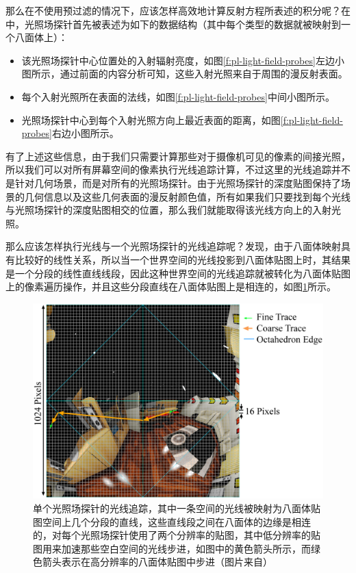 那么在不使用预过滤的情况下，应该怎样高效地计算反射方程所表述的积分呢？在\cite{a:Real-TimeGlobalIlluminationusingPrecomputedLightFieldProbes}中，光照场探针首先被表述为如下的数据结构\cite{a:ALightFieldRepresentationforRealTimeGlobalIllumination}（其中每个类型的数据就被映射到一个八面体上）：

\begin{itemize}
	\item 该光照场探针中心位置处的入射辐射亮度，如图\ref{f:pl-light-field-probes}左边小图所示，通过前面的内容分析可知，这些入射光照来自于周围的漫反射表面。
	\item 每个入射光照所在表面的法线，如图\ref{f:pl-light-field-probes}中间小图所示。
	\item 光照场探针中心到每个入射光照方向上最近表面的距离，如图\ref{f:pl-light-field-probes}右边小图所示。
\end{itemize}

有了上述这些信息，由于我们只需要计算那些对于摄像机可见的像素的间接光照，所以我们可以对所有屏幕空间的像素执行光线追踪计算，不过这里的光线追踪并不是针对几何场景，而是对所有的光照场探针。由于光照场探针的深度贴图保持了场景的几何信息以及这些几何表面的漫反射颜色值，所有如果我们只要找到每个光线与光照场探针的深度贴图相交的位置，那么我们就能取得该光线方向上的入射光照。

那么应该怎样执行光线与一个光照场探针的光线追踪呢？\cite{a:ALightFieldRepresentationforRealTimeGlobalIllumination}发现，由于八面体映射具有比较好的线性关系，所以当一个世界空间的光线投影到八面体贴图上时，其结果是一个分段的线性直线线段，因此这种世界空间的光线追踪就被转化为八面体贴图上的像素遍历操作，并且这些分段直线在八面体贴图上是相连的，如图\ref{f:pl-single-probe-ray-tracing}所示。

\begin{figure}
	\includegraphics[width=\textwidth]{figures/pl/single-probe-ray-tracing}
	\caption{单个光照场探针的光线追踪，其中一条空间的光线被映射为八面体贴图空间上几个分段的直线，这些直线段之间在八面体的边缘是相连的，\cite{a:Real-TimeGlobalIlluminationusingPrecomputedLightFieldProbes}对每个光照场探针使用了两个分辨率的贴图，其中低分辨率的贴图用来加速那些空白空间的光线步进，如图中的黄色箭头所示，而绿色箭头表示在高分辨率的八面体贴图中步进（图片来自\cite{a:Real-TimeGlobalIlluminationusingPrecomputedLightFieldProbes}）}
	\label{f:pl-single-probe-ray-tracing}
\end{figure}

